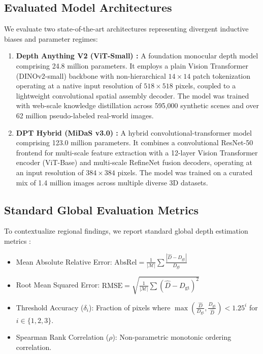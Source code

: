 \documentclass[11pt,a4paper]{article}
\begin{document}
\subsection{Evaluated Model Architectures}
We evaluate two state-of-the-art architectures representing divergent inductive biases and parameter regimes:
\begin{enumerate}
    \item \textbf{Depth Anything V2 (ViT-Small) \citep{yang2024depthanythingv2}:} A foundation monocular depth model comprising 24.8 million parameters. It employs a plain Vision Transformer (DINOv2-small) backbone with non-hierarchical $14 \times 14$ patch tokenization operating at a native input resolution of $518 \times 518$ pixels, coupled to a lightweight convolutional spatial assembly decoder. The model was trained with web-scale knowledge distillation across 595,000 synthetic scenes and over 62 million pseudo-labeled real-world images.
    \item \textbf{DPT Hybrid (MiDaS v3.0) \citep{ranftl2021vision,ranftl2022towards}:} A hybrid convolutional-transformer model comprising 123.0 million parameters. It combines a convolutional ResNet-50 frontend for multi-scale feature extraction with a 12-layer Vision Transformer encoder (ViT-Base) and multi-scale RefineNet fusion decoders, operating at an input resolution of $384 \times 384$ pixels. The model was trained on a curated mix of 1.4 million images across multiple diverse 3D datasets.
\end{enumerate}

\subsection{Standard Global Evaluation Metrics}
To contextualize regional findings, we report standard global depth estimation metrics \citep{rajapaksha2024deep}:
\begin{itemize}
    \item Mean Absolute Relative Error: $\text{AbsRel} = \frac{1}{|\mathcal{M}|} \sum \frac{|\hat{D} - D_{\mathrm{gt}}|}{D_{\mathrm{gt}}}$
    \item Root Mean Squared Error: $\text{RMSE} = \sqrt{\frac{1}{|\mathcal{M}|} \sum (\hat{D} - D_{\mathrm{gt}})^2}$
    \item Threshold Accuracy ($\delta_i$): Fraction of pixels where $\max(\frac{\hat{D}}{D_{\mathrm{gt}}}, \frac{D_{\mathrm{gt}}}{\hat{D}}) < 1.25^i$ for $i \in \{1, 2, 3\}$.
    \item Spearman Rank Correlation ($\rho$): Non-parametric monotonic ordering correlation.
\end{itemize}
\end{document}
